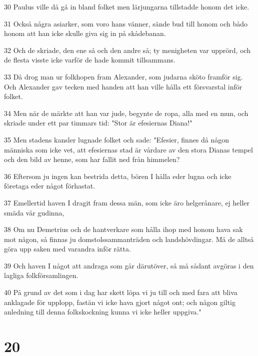 \par 30 Paulus ville då gå in bland folket men lärjungarna tillstadde honom det icke.
\par 31 Också några asiarker, som voro hans vänner, sände bud till honom och bådo honom att han icke skulle giva sig in på skådebanan.
\par 32 Och de skriade, den ene så och den andre så; ty menigheten var upprörd, och de flesta visste icke varför de hade kommit tillsammans.
\par 33 Då drog man ur folkhopen fram Alexander, som judarna sköto framför sig. Och Alexander gav tecken med handen att han ville hålla ett försvarstal inför folket.
\par 34 Men när de märkte att han var jude, begynte de ropa, alla med en mun, och skriade under ett par timmars tid: "Stor är efesiernas Diana!"
\par 35 Men stadens kansler lugnade folket och sade: "Efesier, finnes då någon människa som icke vet, att efesiernas stad är vårdare av den stora Dianas tempel och den bild av henne, som har fallit ned från himmelen?
\par 36 Eftersom ju ingen kan bestrida detta, bören I hålla eder lugna och icke företaga eder något förhastat.
\par 37 Emellertid haven I dragit fram dessa män, som icke äro helgerånare, ej heller smäda vår gudinna,
\par 38 Om nu Demetrius och de hantverkare som hålla ihop med honom hava sak mot någon, så finnas ju domstolssammanträden och landshövdingar. Må de alltså göra upp saken med varandra inför rätta.
\par 39 Och haven I något att andraga som går därutöver, så må sådant avgöras i den lagliga folkförsamlingen.
\par 40 På grund av det som i dag har skett löpa vi ju till och med fara att bliva anklagade för upplopp, fastän vi icke hava gjort något ont; och någon giltig anledning till denna folkskockning kunna vi icke heller uppgiva."

\chapter{20}

